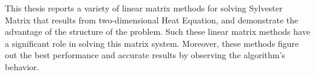 This thesis reports a variety of linear matrix methods for solving Sylvester Matrix that results from two-dimensional Heat Equation, and demonstrate the advantage of the structure of the problem. Such these linear matrix methods have a significant role in solving this matrix system. Moreover, these methods figure out the best performance and accurate results by observing the algorithm’s behavior.